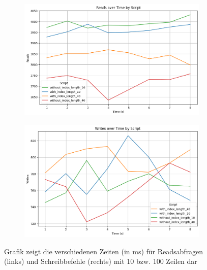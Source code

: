 \begin{figure}[!ht]
    \centering
    \begin{subfigure}[t]{0.48\textwidth}
        \centering
        \includegraphics[width=\textwidth]{PNGs/Script/Index/B_Tree/low-count/Reads}
        \label{low-reads}
    \end{subfigure}
    \hfill
    \begin{subfigure}[t]{0.48\textwidth}
        \centering
        \includegraphics[width=\textwidth]{PNGs/Script/Index/B_Tree/low-count/Writes}
        \label{low-writes}
    \end{subfigure}
    \caption[Low-Counts: Reads und Writes]{Grafik zeigt die verschiedenen Zeiten (in ms) für Readsabfragen (links) und Schreibbefehle (rechts) mit 10 bzw. 100 Zeilen dar}
    \label{fig:low-b-tree-columns}
\end{figure}

